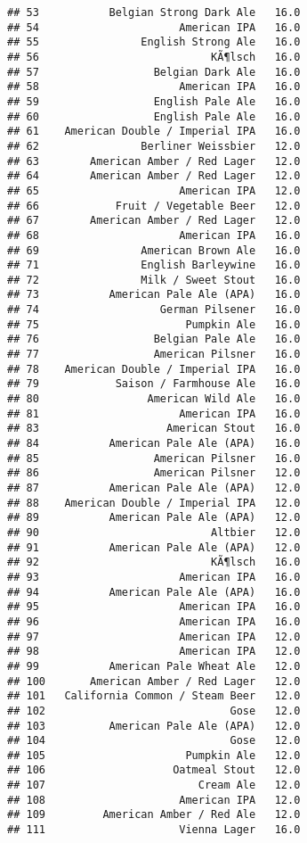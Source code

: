 \documentclass[
]{article}
\begin{document}
\begin{verbatim}
## 53           Belgian Strong Dark Ale   16.0
## 54                      American IPA   16.0
## 55                English Strong Ale   16.0
## 56                           KÃ¶lsch   16.0
## 57                  Belgian Dark Ale   16.0
## 58                      American IPA   16.0
## 59                  English Pale Ale   16.0
## 60                  English Pale Ale   16.0
## 61    American Double / Imperial IPA   16.0
## 62                Berliner Weissbier   12.0
## 63        American Amber / Red Lager   12.0
## 64        American Amber / Red Lager   12.0
## 65                      American IPA   12.0
## 66            Fruit / Vegetable Beer   12.0
## 67        American Amber / Red Lager   12.0
## 68                      American IPA   16.0
## 69                American Brown Ale   16.0
## 71                English Barleywine   16.0
## 72                Milk / Sweet Stout   16.0
## 73           American Pale Ale (APA)   16.0
## 74                   German Pilsener   16.0
## 75                       Pumpkin Ale   16.0
## 76                  Belgian Pale Ale   16.0
## 77                  American Pilsner   16.0
## 78    American Double / Imperial IPA   16.0
## 79            Saison / Farmhouse Ale   16.0
## 80                 American Wild Ale   16.0
## 81                      American IPA   16.0
## 83                    American Stout   16.0
## 84           American Pale Ale (APA)   16.0
## 85                  American Pilsner   16.0
## 86                  American Pilsner   12.0
## 87           American Pale Ale (APA)   12.0
## 88    American Double / Imperial IPA   12.0
## 89           American Pale Ale (APA)   12.0
## 90                           Altbier   12.0
## 91           American Pale Ale (APA)   12.0
## 92                           KÃ¶lsch   16.0
## 93                      American IPA   16.0
## 94           American Pale Ale (APA)   16.0
## 95                      American IPA   16.0
## 96                      American IPA   16.0
## 97                      American IPA   12.0
## 98                      American IPA   12.0
## 99           American Pale Wheat Ale   12.0
## 100       American Amber / Red Lager   12.0
## 101   California Common / Steam Beer   12.0
## 102                             Gose   12.0
## 103          American Pale Ale (APA)   12.0
## 104                             Gose   12.0
## 105                      Pumpkin Ale   12.0
## 106                    Oatmeal Stout   12.0
## 107                        Cream Ale   12.0
## 108                     American IPA   12.0
## 109         American Amber / Red Ale   12.0
## 111                     Vienna Lager   16.0

\end{verbatim}
\end{document}
